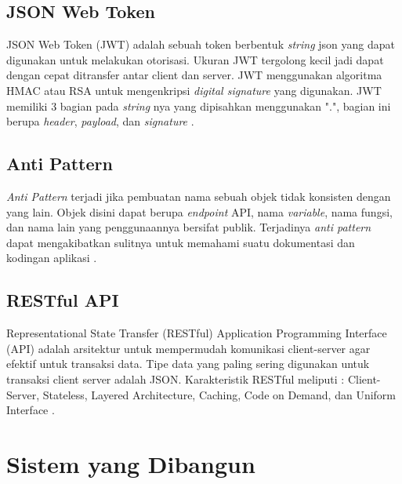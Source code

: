 \subsection{JSON Web Token}
JSON Web Token (JWT) adalah sebuah token berbentuk \textit{string} json yang dapat digunakan untuk melakukan otorisasi. Ukuran JWT tergolong kecil jadi dapat dengan cepat ditransfer antar client dan server. JWT menggunakan algoritma HMAC atau RSA untuk mengenkripsi \textit{digital signature} yang digunakan. JWT memiliki 3 bagian pada \textit{string} nya yang dipisahkan menggunakan ".", bagian ini berupa \textit{header}, \textit{payload}, dan \textit{signature} \cite{rahmatullo2019stateless}.

\subsection{Anti Pattern}
\textit{Anti Pattern} terjadi jika pembuatan nama sebuah objek tidak konsisten dengan yang lain. Objek disini dapat berupa \textit{endpoint} API, nama \textit{variable}, nama fungsi, dan nama lain yang penggunaannya bersifat publik. Terjadinya \textit{anti pattern} dapat mengakibatkan sulitnya untuk memahami suatu dokumentasi dan kodingan aplikasi \cite{Aghajani2018} \cite{Alshraiedeh2021}.

\subsection{RESTful API}
Representational State Transfer (RESTful) Application Programming Interface (API) adalah arsitektur untuk mempermudah komunikasi client-server agar efektif untuk transaksi data. Tipe data yang paling sering digunakan untuk transaksi client server adalah JSON. Karakteristik RESTful meliputi : Client-Server, Stateless, Layered Architecture, Caching, Code on Demand, dan Uniform Interface \cite{giessler2015best}.

\newpage
\section{Sistem yang Dibangun}

